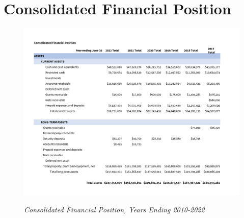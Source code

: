 
\chapter{Consolidated Financial Position}\label{ch:consolidated_financial_position}
\begin{figure}[hbt]
    \caption[Consolidated Financial Position, Years Ending 2010–2022]{\textit{Consolidated Financial Position, Years Ending 2010-2022}}\label{fig:consolidated_financial_position_2010-2022} %
    \includegraphics[width=\textwidth]{Consolidated Financial Statements/v5 Spreadsheets/Consolidated_Financial_Position_Years_2010-2022 PDF pages/.pg_0001}\\ %
\end{figure}
